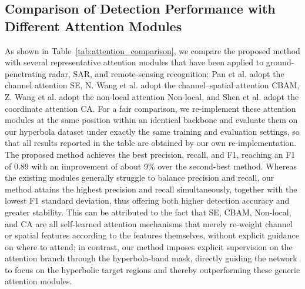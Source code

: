 \documentclass[lettersize,journal]{IEEEtran}
\begin{document}
\subsection{Comparison of Detection Performance with Different Attention Modules}
As shown in Table~\ref{tab:attention_comparison}, we compare the proposed method with several representative attention modules that have been applied to ground-penetrating radar, SAR, and remote-sensing recognition: Pan et al. adopt the channel attention SE, N. Wang et al. adopt the channel–spatial attention CBAM, Z. Wang et al. adopt the non-local attention Non-local, and Shen et al. adopt the coordinate attention CA. For a fair comparison, we re-implement these attention modules at the same position within an identical backbone and evaluate them on our hyperbola dataset under exactly the same training and evaluation settings, so that all results reported in the table are obtained by our own re-implementation. The proposed method achieves the best precision, recall, and F1, reaching an F1 of 0.89 with an improvement of about 9\% over the second-best method. Whereas the existing modules generally struggle to balance precision and recall, our method attains the highest precision and recall simultaneously, together with the lowest F1 standard deviation, thus offering both higher detection accuracy and greater stability. This can be attributed to the fact that SE, CBAM, Non-local, and CA are all self-learned attention mechanisms that merely re-weight channel or spatial features according to the features themselves, without explicit guidance on where to attend; in contrast, our method imposes explicit supervision on the attention branch through the hyperbola-band mask, directly guiding the network to focus on the hyperbolic target regions and thereby outperforming these generic attention modules.
\end{document}
